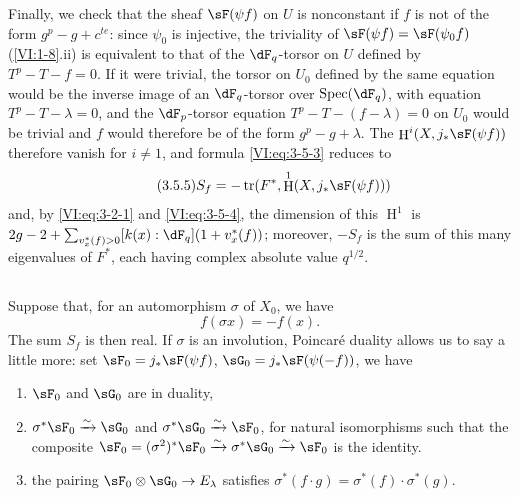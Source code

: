 \documentclass[oneside]{book}
\DeclareMathOperator{\h}{H}
\DeclareMathOperator{\spec}{Spec}
\DeclareMathOperator{\tr}{tr}
\newcommand{\iso}{\xrightarrow\sim}
\theoremstyle{sga-source}
\theoremstyle{sga-source-dash}
\theoremstyle{sga-source-dotdash}
\theoremstyle{sga-source-number-note-dash}
\theoremstyle{sga-source-note-number-dotdash}
\theoremstyle{sga-source-example-dotdash}
\theoremstyle{sga-source-inline-number}
\theoremstyle{sga-source-bare-number}
\theoremstyle{sga-source}
\newcommand{\PrintPage}[1]{}\newcommand{\MathPage}[1]{}\newcommand{\PrintCite}[2]{#1}\newcommand{\var}[3]{#1}
\begin{document}
Finally, we check that the sheaf $\sF(\psi f)$ on $U$ is nonconstant if 
$f$ is not of the form $g^p-g+c^{t e}$: since $\psi_0$ is injective, the 
triviality of $\sF(\psi f)=\sF(\psi_0 f)$ (\ref{VI:1-8}.ii) is equivalent to 
\var{that of the $\dF_q$-torsor}{that of the $\dF_p$-torsor}{S45-SOL-0771} on $U$ defined by $T^p-T-f=0$. If it were trivial, 
the torsor on $U_0$ defined by the same equation \PrintPage{192}
would be the inverse image of an 
\var{$\dF_q$-torsor over $\spec(\dF_q)$}{$\dF_p$-torsor over $\spec(\dF_q)$}{S45-SOL-0773}, with equation $T^p-T-\lambda=0$, and the 
$\dF_p$-torsor equation $T^p-T-(f-\lambda)=0$ on $U_0$ would be trivial 
and $f$ would therefore be of the form $g^p-g+\lambda$. The 
$\h^i(X,j_\ast \sF(\psi f))$ therefore vanish for $i\ne 1$, and formula 
\eqref{VI:eq:3-5-3} reduces to 
\begin{equation*}\tag{3.5.5}\label{VI:eq:3-5-5}
  S_f = -\tr(F^\ast,\h^1(X,j_\ast \sF(\psi f))) 
\end{equation*}
and, by \eqref{VI:eq:3-2-1} and \eqref{VI:eq:3-5-4}, the dimension of this $\h^1$ is 
$2 g-2+\sum_{v_x^\ast(f)>0} [k(x):\dF_q](1+v_x^\ast(f))$; moreover, $-S_f$ 
is the sum of this many eigenvalues of $F^\ast$, each having complex 
absolute value $q^{1/2}$. 





\subsection{}\label{VI:3-6}

Suppose that, for an automorphism $\sigma$ of $X_0$, we have 
\[
  f(\sigma x) = - f(x) \text{.} 
\]
The sum $S_f$ is then real. If $\sigma$ is an involution, Poincaré 
duality allows us to say a little more: set 
$\sF_0=j_\ast \sF(\psi f)$, $\sG_0 = j_\ast \sF(\psi(-f))$, we have 
\begin{enumerate}[\indent a)]
  \item $\sF_0$ and $\sG_0$ are in duality, 
  \item $\sigma^\ast \sF_0 \iso \sG_0$ and $\sigma^\ast \sG_0 \iso \sF_0$, for 
    natural isomorphisms such that the composite 
    $\sF_0=(\sigma^2)^\ast \sF_0 \iso \sigma^\ast \sG_0 \iso \sF_0$ 
    is the identity. 
  \item the pairing $\sF_0\otimes \sG_0 \to E_\lambda$ satisfies 
    $\sigma^\ast(f\cdot g) = \sigma^\ast(f) \cdot \sigma^\ast (g)$. 
\end{enumerate} 
\end{document}
